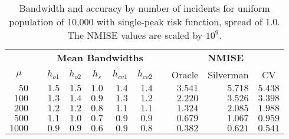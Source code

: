 \begin{table}[htbp]
\begin{center}
\begin{tabular}{rcrrrrrcrrr}
\hline\hline
\multicolumn{1}{c}{\bfseries }&\multicolumn{1}{c}{\bfseries }&\multicolumn{5}{c}{\bfseries Mean Bandwidths}&\multicolumn{1}{c}{\bfseries }&\multicolumn{3}{c}{\bfseries NMISE}\tabularnewline
\cline{3-7} \cline{9-11}
\multicolumn{1}{c}{$\mu$}&\multicolumn{1}{c}{}&\multicolumn{1}{c}{$h_{o1}$}&\multicolumn{1}{c}{$h_{o2}$}&\multicolumn{1}{c}{$h_{s}$}&\multicolumn{1}{c}{$h_{cv1}$}&\multicolumn{1}{c}{$h_{cv2}$}&\multicolumn{1}{c}{}&\multicolumn{1}{c}{Oracle}&\multicolumn{1}{c}{Silverman}&\multicolumn{1}{c}{CV}\tabularnewline
\hline
$  50$&&$1.5$&$1.5$&$1.0$&$1.4$&$1.4$&&$3.541$&$5.718$&$5.438$\tabularnewline
$ 100$&&$1.3$&$1.4$&$0.9$&$1.3$&$1.2$&&$2.220$&$3.526$&$3.398$\tabularnewline
$ 200$&&$1.2$&$1.2$&$0.8$&$1.1$&$1.1$&&$1.324$&$2.085$&$1.988$\tabularnewline
$ 500$&&$1.1$&$1.0$&$0.7$&$0.9$&$0.9$&&$0.679$&$1.067$&$0.959$\tabularnewline
$1000$&&$0.9$&$0.9$&$0.6$&$0.9$&$0.8$&&$0.382$&$0.621$&$0.541$\tabularnewline
\hline
\end{tabular}
\caption[Bandwidth and accuracy by number of incidents]{Bandwidth and accuracy by number of incidents for uniform population of 10,000 with single-peak risk function, spread of 1.0. The NMISE values are scaled by $10^9$.\label{tab:results:bandwidth_vs_mu}}\end{center}
\end{table}
